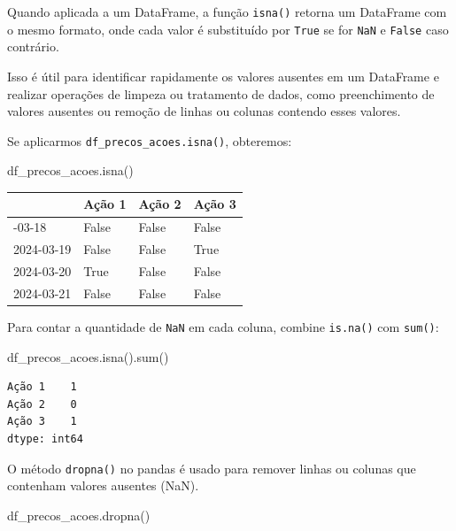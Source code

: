 \documentclass[
  portuguese,
  letterpaper,
  DIV=11,
  numbers=noendperiod]{scrreprt}
\newenvironment{Shaded}{\begin{snugshade}}{\end{snugshade}}
\newcommand{\BuiltInTok}[1]{\textcolor[rgb]{0.00,0.23,0.31}{#1}}
\newcommand{\NormalTok}[1]{\textcolor[rgb]{0.00,0.23,0.31}{#1}}
\theoremstyle{definition}
\theoremstyle{remark}
\begin{document}
Quando aplicada a um DataFrame, a função \texttt{isna()} retorna um
DataFrame com o mesmo formato, onde cada valor é substituído por
\texttt{True} se for \texttt{NaN} e \texttt{False} caso contrário.

Isso é útil para identificar rapidamente os valores ausentes em um
DataFrame e realizar operações de limpeza ou tratamento de dados, como
preenchimento de valores ausentes ou remoção de linhas ou colunas
contendo esses valores.

Se aplicarmos \texttt{df\_precos\_acoes.isna()}, obteremos:

\begin{Shaded}
\begin{Highlighting}[]
\NormalTok{df\_precos\_acoes.isna()}
\end{Highlighting}
\end{Shaded}

\begin{longtable}[]{@{}llll@{}}
\toprule\noalign{}
& Ação 1 & Ação 2 & Ação 3 \\
\midrule\noalign{}
\endhead
\bottomrule\noalign{}
\endlastfoot
2024-03-18 & False & False & False \\
2024-03-19 & False & False & True \\
2024-03-20 & True & False & False \\
2024-03-21 & False & False & False \\
\end{longtable}

Para contar a quantidade de \texttt{NaN} em cada coluna, combine
\texttt{is.na()} com \texttt{sum()}:

\begin{Shaded}
\begin{Highlighting}[]
\NormalTok{df\_precos\_acoes.isna().}\BuiltInTok{sum}\NormalTok{()}
\end{Highlighting}
\end{Shaded}

\begin{verbatim}
Ação 1    1
Ação 2    0
Ação 3    1
dtype: int64
\end{verbatim}

O método \texttt{dropna()} no pandas é usado para remover linhas ou
colunas que contenham valores ausentes (NaN).

\begin{Shaded}
\begin{Highlighting}[]
\NormalTok{df\_precos\_acoes.dropna()}
\end{Highlighting}
\end{Shaded}
\end{document}
